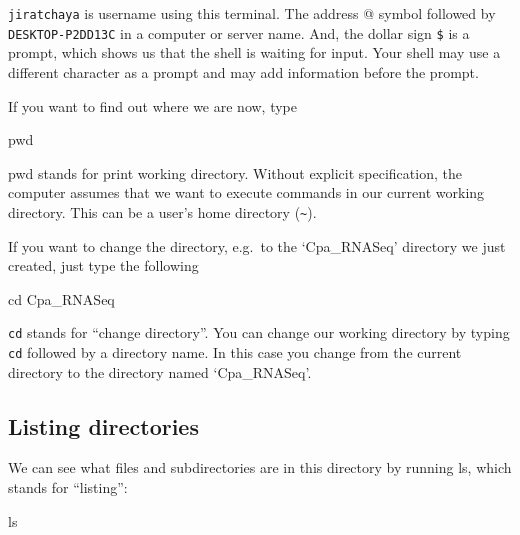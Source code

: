 \documentclass[
  letterpaper,
  DIV=11,
  numbers=noendperiod]{scrreprt}
\newenvironment{Shaded}{\begin{snugshade}}{\end{snugshade}}
\newcommand{\BuiltInTok}[1]{\textcolor[rgb]{0.00,0.23,0.31}{#1}}
\newcommand{\ExtensionTok}[1]{\textcolor[rgb]{0.00,0.23,0.31}{#1}}
\newcommand{\FunctionTok}[1]{\textcolor[rgb]{0.28,0.35,0.67}{#1}}
\newcommand{\NormalTok}[1]{\textcolor[rgb]{0.00,0.23,0.31}{#1}}
\begin{document}
\begin{Shaded}
\end{Shaded}

\texttt{jiratchaya} is username using this terminal. The address @
symbol followed by \texttt{DESKTOP-P2DD13C} in a computer or server
name. And, the dollar sign \texttt{\$} is a prompt, which shows us that
the shell is waiting for input. Your shell may use a different character
as a prompt and may add information before the prompt.

If you want to find out where we are now, type

\begin{Shaded}
\begin{Highlighting}[]
\BuiltInTok{pwd}
\end{Highlighting}
\end{Shaded}

pwd stands for print working directory. Without explicit specification,
the computer assumes that we want to execute commands in our current
working directory. This can be a user's home directory
(\texttt{\textasciitilde{}}).

If you want to change the directory, e.g.~to the `Cpa\_RNASeq' directory
we just created, just type the following

\begin{Shaded}
\begin{Highlighting}[]
\BuiltInTok{cd}\NormalTok{ Cpa\_RNASeq}
\end{Highlighting}
\end{Shaded}

\texttt{cd} stands for ``change directory''. You can change our working
directory by typing \texttt{cd} followed by a directory name. In this
case you change from the current directory to the directory named
`Cpa\_RNASeq'.

\hypertarget{listing-directories}{%
\subsection*{Listing directories}\label{listing-directories}}

We can see what files and subdirectories are in this directory by
running ls, which stands for ``listing'':

\begin{Shaded}
\begin{Highlighting}[]
\FunctionTok{ls}
\end{Highlighting}
\end{Shaded}
\end{document}

